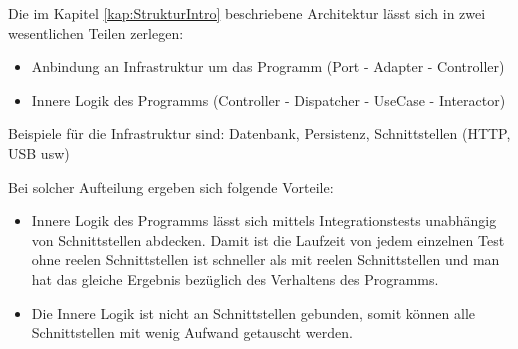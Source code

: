 
    Die im Kapitel \ref{kap:StrukturIntro} beschriebene Architektur lässt sich in zwei wesentlichen Teilen zerlegen:
    \begin{itemize}
        \item Anbindung an Infrastruktur um das Programm (Port - Adapter - Controller)
        \item Innere Logik des Programms (Controller - Dispatcher - UseCase - Interactor)
    \end{itemize}

    Beispiele für die Infrastruktur sind: Datenbank, Persistenz, Schnittstellen (HTTP, USB usw)

    Bei solcher Aufteilung ergeben sich folgende Vorteile:
    \begin{itemize}
        \item Innere Logik des Programms lässt sich mittels Integrationstests unabhängig von Schnittstellen abdecken.
        Damit ist die Laufzeit von jedem einzelnen Test ohne reelen Schnittstellen ist schneller als mit reelen Schnittstellen und 
        man hat das gleiche Ergebnis bezüglich des Verhaltens des Programms.
        \item Die Innere Logik ist nicht an Schnittstellen gebunden, 
        somit können alle Schnittstellen mit wenig Aufwand getauscht werden.
    \end{itemize}
